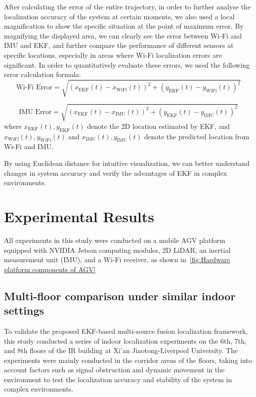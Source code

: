 \documentclass[12pt,a4paper]{article}
\numberwithin{equation}{section}
\begin{document}
After calculating the error of the entire trajectory, in order to further
analyse the localization accuracy of the system at certain moments, we also used
a local magnification to show the specific situation at the point of maximum
error. By magnifying the displayed area, we can clearly see the error between
Wi-Fi and IMU and EKF, and further compare the performance of different sensors
at specific locations, especially in areas where Wi-Fi localization errors are
significant. In order to quantitatively evaluate these errors, we used the
following error calculation formula:
\begin{equation}
  \text{Wi-Fi Error} = \sqrt{(x_{\text{EKF}}(t) - x_{\text{WiFi}}(t))^2 + (y_{\text{EKF}}(t) - y_{\text{WiFi}}(t))^2}
\end{equation}

\begin{equation}
  \text{IMU Error} = \sqrt{(x_{\text{EKF}}(t) - x_{\text{IMU}}(t))^2 + (y_{\text{EKF}}(t) - y_{\text{IMU}}(t))^2}
\end{equation}
where \( x_{\text{EKF}}(t), y_{\text{EKF}}(t) \) denote the 2D location
estimated by EKF, and \( x_{\text{WiFi}}(t), y_{\text{WiFi}}(t) \) and \(
x_{\text{IMU}}(t), y_{\text{IMU}}(t) \) denote the predicted location from Wi-Fi
and IMU.

By using Euclidean distance for intuitive visualization, we can better
understand changes in system accuracy and verify the advantages of EKF in
complex environments.


\newpage
\section{Experimental Results}
\label{sec:experimental-results}
All experiments in this study were conducted on a mobile AGV platform equipped
with NVIDIA Jetson computing modules, 2D LiDAR, an inertial measurement unit
(IMU), and a Wi-Fi receiver, as shown in~\autoref{fig:Hardware platform
  components of AGV}

\subsection{Multi-floor comparison under similar indoor settings}
To validate the proposed EKF-based multi-source fusion localization framework,
this study conducted a series of indoor localization experiments on the 6th,
7th, and 8th floors of the IR building at Xi'an Jiaotong-Liverpool
University. The experiments were mainly conducted in the corridor areas of the
floors, taking into account factors such as signal obstruction and dynamic
movement in the environment to test the localization accuracy and stability of
the system in complex environments.
\end{document}
